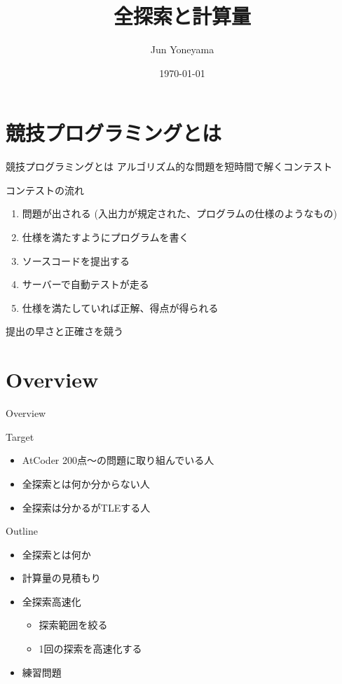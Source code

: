\documentclass[dvipdfmx]{beamer}
\title{全探索と計算量}
\author{Jun Yoneyama}
\date{\today}
\begin{document}
\frame{\maketitle}

\section{競技プログラミングとは}

\begin{frame}{競技プログラミングとは}
  アルゴリズム的な問題を短時間で解くコンテスト
  \begin{block}{コンテストの流れ}
    \begin{enumerate}
      \item 問題が出される (入出力が規定された、プログラムの仕様のようなもの)
      \item 仕様を満たすようにプログラムを書く
      \item ソースコードを提出する
      \item サーバーで自動テストが走る
      \item 仕様を満たしていれば正解、得点が得られる
    \end{enumerate}
    提出の早さと正確さを競う
  \end{block}
\end{frame}

\section{Overview}

\begin{frame}{Overview}
  \begin{block}{Target}
    \begin{itemize}
      \item AtCoder 200点～の問題に取り組んでいる人
      \item 全探索とは何か分からない人
      \item 全探索は分かるがTLEする人
    \end{itemize}
  \end{block}
  \begin{block}{Outline}
    \begin{itemize}
      \item 全探索とは何か
      \item 計算量の見積もり
      \item 全探索高速化
      \begin{itemize}
        \item 探索範囲を絞る
        \item 1回の探索を高速化する
      \end{itemize}
      \item 練習問題
    \end{itemize}
  \end{block}
\end{frame}
\end{document}
